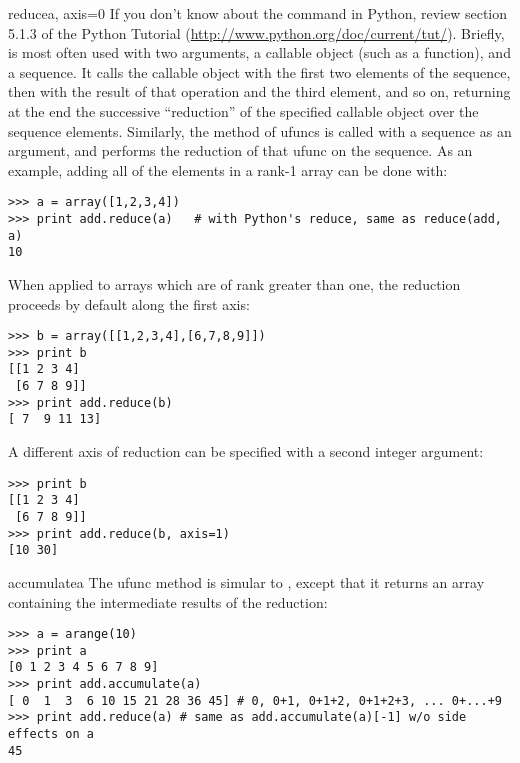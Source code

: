 \begin{methoddesc}{reduce}{a, axis=0}
   If you don't know about the  command in Python, review
   section 5.1.3 of the Python Tutorial
   (\url{http://www.python.org/doc/current/tut/}). Briefly,
    is most often used with two arguments, a callable object
   (such as a function), and a sequence. It calls the callable object with the
   first two elements of the sequence, then with the result of that operation
   and the third element, and so on, returning at the end the successive
   ``reduction'' of the specified callable object over the sequence elements.
   Similarly, the  method of ufuncs is called with a sequence as
   an argument, and performs the reduction of that ufunc on the sequence. As an
   example, adding all of the elements in a rank-1 array can be done with:
\begin{verbatim}
>>> a = array([1,2,3,4])
>>> print add.reduce(a)   # with Python's reduce, same as reduce(add, a)
10
\end{verbatim}
   When applied to arrays which are of rank greater than one, the reduction
   proceeds by default along the first axis:
\begin{verbatim}
>>> b = array([[1,2,3,4],[6,7,8,9]])
>>> print b
[[1 2 3 4]
 [6 7 8 9]]
>>> print add.reduce(b)
[ 7  9 11 13]
\end{verbatim}
   A different axis of reduction can be specified with a second integer
   argument:
\begin{verbatim}
>>> print b
[[1 2 3 4]
 [6 7 8 9]]
>>> print add.reduce(b, axis=1)
[10 30]
\end{verbatim}
\end{methoddesc}


\begin{methoddesc}{accumulate}{a}
   The  ufunc method is simular to , except
   that it returns an array containing the intermediate results of the
   reduction:
\begin{verbatim}
>>> a = arange(10)
>>> print a
[0 1 2 3 4 5 6 7 8 9]
>>> print add.accumulate(a)
[ 0  1  3  6 10 15 21 28 36 45] # 0, 0+1, 0+1+2, 0+1+2+3, ... 0+...+9
>>> print add.reduce(a) # same as add.accumulate(a)[-1] w/o side effects on a
45                                      
\end{verbatim}
\end{methoddesc}


